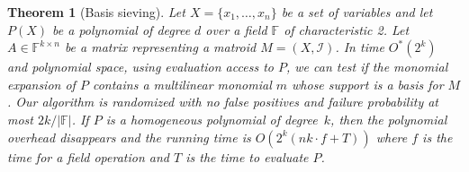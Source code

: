 \documentclass[10pt,a4paper]{article}
\newtheorem{theorem}{Theorem}[section]
\newcommand{\F}{\ensuremath{\mathbb F}\xspace}
\newcommand{\cI}{\ensuremath{\mathcal I}\xspace}
\begin{document}
\begin{theorem}[Basis sieving] \label{theorem:sieve-basis}
  Let $X=\{x_1,\ldots,x_n\}$ be a set of variables and 
  let $P(X)$ be a polynomial of degree $d$ over a field $\F$ of characteristic 2.
  Let $A \in \F^{k \times n}$ be a matrix representing a matroid $M=(X, \cI)$. 
  In time $O^*(2^k)$ and polynomial space, using evaluation access to $P$, 
  we can test if the monomial expansion of $P$ contains a multilinear monomial
  $m$ whose support is a basis for $M$. Our algorithm is randomized with no false
  positives and failure probability at most $2k/|\F|$.
  If $P$ is a homogeneous polynomial of degree~$k$, then the polynomial overhead
  disappears and the running time is $O(2^k(nk\cdot f +T))$ where
  $f$ is the time for a field operation and $T$ is the time to
  evaluate $P$.
\end{theorem}
\end{document}
